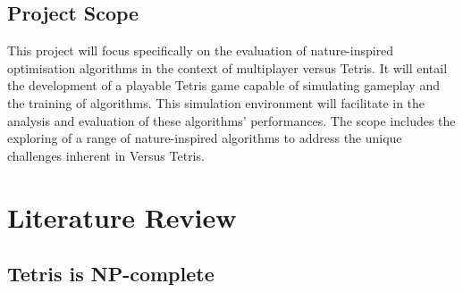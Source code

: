 \documentclass[a4paper, 12pt]{extreport}
\begin{document}
		\section{Project Scope}
			
			
			This project will focus specifically on the evaluation of nature-inspired optimisation algorithms in the context of multiplayer versus Tetris. It will entail the development of a playable Tetris game capable of simulating gameplay and the training of algorithms. This simulation environment will facilitate in the analysis and evaluation of these algorithms' performances. The scope includes the exploring of a range of nature-inspired algorithms to address the unique challenges inherent in Versus Tetris.
			
		
	
	\chapter{Literature Review}
		
		
		\section{Tetris is NP-complete}
		
\end{document}
